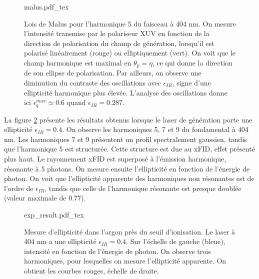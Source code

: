 \begin{figure}[!ht]
\centering
\def\svgwidth{0.7\columnwidth}
{malus.pdf_tex}
\caption{Lois de Malus pour l'harmonique 5 du faisceau à 404 nm. On mesure l'intensité transmise par le polariseur XUV en fonction de la direction de polarisation du champ de génération, lorsqu'il est polarisé linéairement (rouge) ou elliptiquement (vert). On voit que le champ harmonique est maximal en $\theta_p = \eta$, ce qui donne la direction de son ellipse de polarisation. Par ailleurs, on observe une diminution du contraste des oscillations avec $\epsilon_{IR}$, signe d'une ellipticité harmonique plus élevée. L'analyse des oscillations donne ici $\epsilon_q^{max} \simeq 0.6$ quand $\epsilon_{IR}=0.287$.}
\label{fig:malus}
\end{figure}

La figure \ref{fig:resonant_argon_exp} présente les résultats obtenus lorsque le laser de génération porte une ellipticité $\epsilon_{IR} = 0.4$. On observe les harmoniques 5, 7 et 9 du fondamental à 404 nm. Les harmoniques 7 et 9 présentent un profil spectralement gaussien, tandis que l'harmonique 5 est structurée. Cette structure est due au xFID, effet présenté plus haut. Le rayonnement xFID est superposé à l'émission harmonique, résonante à 5 photons.  On mesure ensuite l'ellipticité en fonction de l'énergie de photon. On voit que l'ellipticité apparente des harmoniques non résonantes est de l'ordre de $\epsilon_{IR}$, tandis que celle de l'harmonique résonante est presque doublée (valeur maximale de 0.77).  

\begin{figure}[!ht]
\centering
\def\svgwidth{1\columnwidth}
{exp_result.pdf_tex}
\caption{Mesure d'ellipticité dans l'argon près du seuil d'ionisation. Le laser à 404 nm a une ellipticité $\epsilon_{IR}=0.4$. Sur l'échelle de gauche (bleue), intensité en fonction de l'énergie de photon. On observe trois harmoniques, pour lesquelles on mesure l'ellipticité apparente. On obtient les courbes rouges, échelle de droite.}
\label{fig:resonant_argon_exp}
\end{figure}

